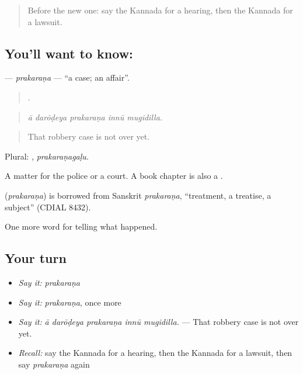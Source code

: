 \label{lesson:KA-C358-prakarana}



\begin{quote}
Before the new one: say the Kannada for a hearing, then the Kannada for a lawsuit.
\end{quote}

\subsection*{You'll want to know: }
\textbf{} — \emph{prakaraṇa} — \textquotedblleft{}a case; an affair\textquotedblright{}.

\begin{quote}
    .
\end{quote}

\begin{quote}
\emph{ā darōḍeya prakaraṇa innū mugidilla.}
\end{quote}

\begin{quote}
That robbery case is not over yet.
\end{quote}

Plural: , \emph{prakaraṇagaḷu}.

A matter for the police or a court. A book chapter is also a .

\begin{cousinweb}
\textbf{} (\emph{prakaraṇa}) is borrowed from Sanskrit \emph{prakaraṇa}, \textquotedblleft{}treatment, a treatise, a subject\textquotedblright{} (CDIAL 8432).
\end{cousinweb}

\begin{grammarlens}[title={What you've built}]
One more word for telling what happened.
\end{grammarlens}

\subsection*{Your turn}
\begin{itemize}
\raggedright
  \item \emph{Say it:} \emph{prakaraṇa}
  \item \emph{Say it:} \emph{prakaraṇa}, once more
  \item \emph{Say it:} \emph{ā darōḍeya prakaraṇa innū mugidilla.} — That robbery case is not over yet.
  \item \emph{Recall:} say the Kannada for a hearing, then the Kannada for a lawsuit, then say \emph{prakaraṇa} again
\end{itemize}

